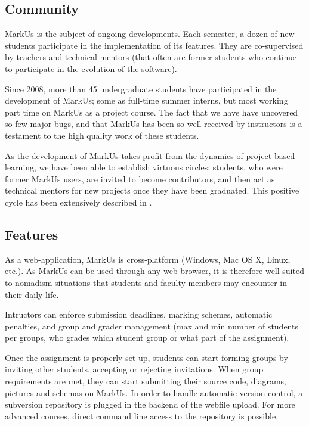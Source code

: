 \documentclass[twocolumn,10pt]{asme2e}
\begin{document}
\subsection*{Community}
MarkUs is the subject of ongoing developments. Each semester, a dozen of new students participate in the implementation of its features. They are co-supervised by teachers and technical mentors (that often are former students who continue to participate in the evolution of the software).

Since 2008, more than 45 undergraduate students have participated in the development of MarkUs; some as full-time summer interns, but most working part time on MarkUs as a project course. The fact that we have have uncovered so few major bugs, and that MarkUs has been so well-received by instructors is a testament to the high quality work of these students. 

As the development of MarkUs takes profit from the dynamics of project-based learning, we have been able to establish virtuous circles: students, who were former MarkUs users, are invited to become contributors, and then act as technical mentors for new projects once they have been graduated. This positive cycle has been extensively described in \cite{magnin-qpes-2011}.

\subsection*{Features}

As a web-application, MarkUs is cross-platform (Windows, Mac OS X, Linux,
etc.). As MarkUs can be used through any web browser, it is therefore
well-suited to nomadism situations that students and faculty members may
encounter in their daily life.

Intructors can enforce submission deadlines, marking schemes, automatic
penalties, and group and grader management (max and min number of students per
groups, who grades which student group or what part of the assignment).

Once the assignment is properly set up, students can start forming groups by
inviting other students, accepting or rejecting invitations. When group
requirements are met, they can start submitting their source code, diagrams,
pictures and schemas on MarkUs. In order to handle automatic version control,
a subversion repository is plugged in the backend of the webfile upload. For
more advanced courses, direct command line access to the repository is
possible.
\end{document}
